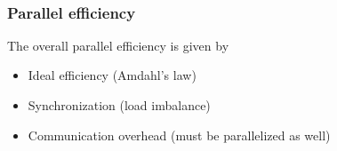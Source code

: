\documentclass[mathserif]{beamer}
\begin{document}
\begin{frame}
\begin{minipage}[b]{0.4\linewidth}
{	\ \\
	}
    \end{minipage}
\end{frame}

\begin{frame}
    \frametitle{Parallel efficiency}
    The overall parallel efficiency is given by
    \begin{itemize}
	\item Ideal efficiency (Amdahl's law)
	\item Synchronization (load imbalance) 
	\item Communication overhead (must be parallelized as well)
    \end{itemize}

\end{frame}
\end{document}
